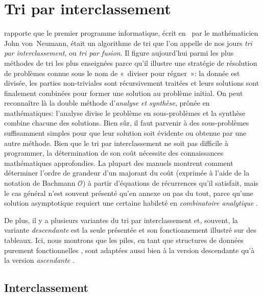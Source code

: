 \chapter{Tri par interclassement}
\label{chap:merge_sort}

\cite{Knuth_1996} rapporte que le premier programme informatique,
écrit en~ par le mathématicien John von~Neumann,
était un algorithme de tri que l'on appelle de nos jours \emph{tri par
interclassement}, ou \emph{tri par fusion}. Il figure aujourd'hui
parmi les plus méthodes de tri les plus enseignées parce qu'il
illustre une stratégie de résolution de problèmes connue sous le nom
de «~diviser pour régner~»: la donnée est
divisée, les parties non-triviales sont récursivement traitées et
leurs solutions sont finalement combinées pour former une solution au
problème initial. On peut reconnaître là la double méthode
d'\emph{analyse et synthèse}, prônée en mathématiques: l'analyse
divise le problème en sous-problèmes et la synthèse combine chacune
des solutions. Bien sûr, il faut parvenir à des sous-problèmes
suffisamment simples pour que leur solution soit évidente ou obtenue
par une autre méthode. Bien que le tri par interclassement ne soit pas
difficile à programmer, la détermination de son coût nécessite des
connaissances mathématiques approfondies. La plupart des manuels
\citep{GrahamKnuthPatashnik_1994,CLRS_2009} montrent comment
déterminer l'ordre de grandeur d'un majorant du coût (exprimée à
l'aide de la notation de Bachmann \(\mathcal{O}\)) à partir
d'équations de récurrences qu'il satisfait, mais le cas général n'est
souvent présenté qu'en annexe ou pas du tout, parce qu'une solution
asymptotique requiert une certaine habileté en \emph{combinatoire
analytique} \citep{FlajoletSedgewick_2001, FlajoletSedgewick_2009,
  FlajoletGolin_1994, Hwang_1998, ChenHwangChen_1999}.

De plus, il y a plusieurs variantes du tri par interclassement
\citep{Knuth_1998,GolinSedgewick_1993} et, souvent, la variante
\emph{descendante} est la seule présentée et son fonctionnement
illustré sur des tableaux. Ici, nous montrons que les piles, en tant
que structures de données purement fonctionnelles
\citep{Okasaki_1998b}, sont adaptées aussi bien à la version
descendante qu'à la version \emph{ascendante}
\citep{PannyProdinger_1995}.


\section{Interclassement}
\label{sec:merging}

